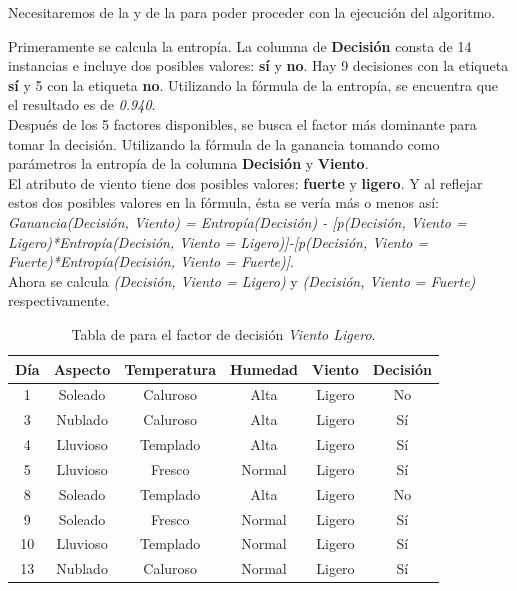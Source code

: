 Necesitaremos de la  y de la  para poder proceder con la ejecución del algoritmo.\\

\begin{UClist}
	\UCli Primeramente se calcula la entropía. La columna de \textbf{Decisión} consta de 14 instancias e incluye dos posibles valores: \textbf{sí} y \textbf{no}. Hay 9 decisiones con la etiqueta \textbf{sí} y 5 con la etiqueta \textbf{no}. Utilizando la fórmula de la entropía, se encuentra que el resultado es de \emph{0.940}.\\
	\UCli Después de los 5 factores disponibles, se busca el factor más dominante para tomar la decisión. Utilizando la fórmula de la ganancia tomando como parámetros la entropía de la columna \textbf{Decisión} y \textbf{Viento}.\\
	\UCli El atributo de viento tiene dos posibles valores: \textbf{fuerte} y \textbf{ligero}. Y al reflejar estos dos posibles valores en la fórmula, ésta se vería más o menos así: \emph{Ganancia(Decisión, Viento) = Entropía(Decisión) - [p(Decisión, Viento = Ligero)*Entropía(Decisión, Viento = Ligero)]-[p(Decisión, Viento = Fuerte)*Entropía(Decisión, Viento = Fuerte)]}.\\
	\UCli Ahora se calcula \emph{(Decisión, Viento = Ligero)} y \emph{(Decisión, Viento = Fuerte)} respectivamente.\\

	\begin{table}[!hb]
		\begin{center}
			\label{tab:tablaInduccionVientoLigero}
			\begin{tabular}{c|c|c|c|c|c}
				\textbf{Día} & \textbf{Aspecto} & \textbf{Temperatura} & \textbf{Humedad} & \textbf{Viento} & \textbf{Decisión}\\
				\hline
				1 & Soleado & Caluroso & Alta & Ligero & No\\
				3 & Nublado & Caluroso & Alta & Ligero & Sí\\
				4 & Lluvioso & Templado & Alta & Ligero & Sí\\
				5 & Lluvioso & Fresco & Normal & Ligero & Sí\\
				8 & Soleado & Templado & Alta & Ligero & No\\
				9 & Soleado & Fresco & Normal & Ligero & Sí\\
				10 & Lluvioso & Templado & Normal & Ligero & Sí\\
				13 & Nublado & Caluroso & Normal & Ligero & Sí\\
			\end{tabular}
		\end{center}
		\caption{Tabla de para el factor de decisión \emph{Viento Ligero}.}
	\end{table}


\end{UClist}
